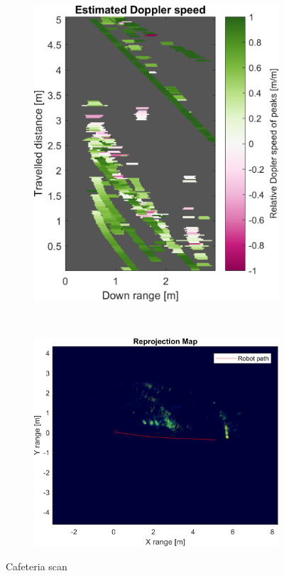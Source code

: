 \begin{figure}[htbp]
\begin{subfigure}[t]{0.475\linewidth}
        \includegraphics[width=\linewidth,max height=.475\textheight]{gfx/results/cafeteria_doppler.png}
    \end{subfigure}\bigskip\\
    \begin{subfigure}[t]{0.5\linewidth}   
        \centering 
        \includegraphics[width=\linewidth,max height=.475\textheight]{gfx/results/cafeteria_reprojection.png}
    \end{subfigure}%
    \caption{Cafeteria scan}
\end{figure}

